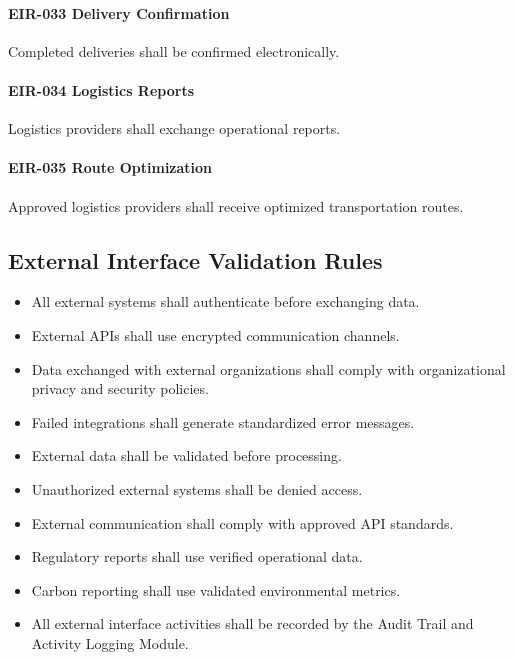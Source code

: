 \paragraph{EIR-033 Delivery Confirmation}

Completed deliveries shall be confirmed electronically.

\paragraph{EIR-034 Logistics Reports}

Logistics providers shall exchange operational reports.

\paragraph{EIR-035 Route Optimization}

Approved logistics providers shall receive optimized transportation
routes.


\subsection*{External Interface Validation Rules}

\begin{itemize}

\item All external systems shall authenticate before exchanging data.

\item External APIs shall use encrypted communication channels.

\item Data exchanged with external organizations shall comply with
organizational privacy and security policies.

\item Failed integrations shall generate standardized error messages.

\item External data shall be validated before processing.

\item Unauthorized external systems shall be denied access.

\item External communication shall comply with approved API standards.

\item Regulatory reports shall use verified operational data.

\item Carbon reporting shall use validated environmental metrics.

\item All external interface activities shall be recorded by the Audit
Trail and Activity Logging Module.

\end{itemize}

